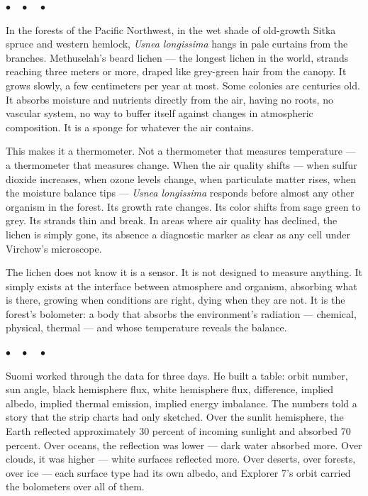 \documentclass[12pt, letterpaper]{article}
\begin{document}
\begin{center}
$\bullet\quad\bullet\quad\bullet$
\end{center}

In the forests of the Pacific Northwest, in the wet shade of old-growth Sitka spruce and western hemlock, \textit{Usnea longissima} hangs in pale curtains from the branches. Methuselah's beard lichen --- the longest lichen in the world, strands reaching three meters or more, draped like grey-green hair from the canopy. It grows slowly, a few centimeters per year at most. Some colonies are centuries old. It absorbs moisture and nutrients directly from the air, having no roots, no vascular system, no way to buffer itself against changes in atmospheric composition. It is a sponge for whatever the air contains.

This makes it a thermometer. Not a thermometer that measures temperature --- a thermometer that measures change. When the air quality shifts --- when sulfur dioxide increases, when ozone levels change, when particulate matter rises, when the moisture balance tips --- \textit{Usnea longissima} responds before almost any other organism in the forest. Its growth rate changes. Its color shifts from sage green to grey. Its strands thin and break. In areas where air quality has declined, the lichen is simply gone, its absence a diagnostic marker as clear as any cell under Virchow's microscope.

The lichen does not know it is a sensor. It is not designed to measure anything. It simply exists at the interface between atmosphere and organism, absorbing what is there, growing when conditions are right, dying when they are not. It is the forest's bolometer: a body that absorbs the environment's radiation --- chemical, physical, thermal --- and whose temperature reveals the balance.

\begin{center}
$\bullet\quad\bullet\quad\bullet$
\end{center}

Suomi worked through the data for three days. He built a table: orbit number, sun angle, black hemisphere flux, white hemisphere flux, difference, implied albedo, implied thermal emission, implied energy imbalance. The numbers told a story that the strip charts had only sketched. Over the sunlit hemisphere, the Earth reflected approximately 30 percent of incoming sunlight and absorbed 70 percent. Over oceans, the reflection was lower --- dark water absorbed more. Over clouds, it was higher --- white surfaces reflected more. Over deserts, over forests, over ice --- each surface type had its own albedo, and Explorer 7's orbit carried the bolometers over all of them.
\end{document}
